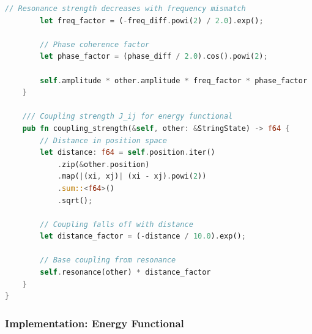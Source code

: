 \documentclass[11pt,a4paper]{article}
\begin{document}
\begin{lstlisting}[language=Rust, caption=String State Implementation from Q-Resonance]
        // Resonance strength decreases with frequency mismatch
        let freq_factor = (-freq_diff.powi(2) / 2.0).exp();

        // Phase coherence factor
        let phase_factor = (phase_diff / 2.0).cos().powi(2);

        self.amplitude * other.amplitude * freq_factor * phase_factor
    }

    /// Coupling strength J_ij for energy functional
    pub fn coupling_strength(&self, other: &StringState) -> f64 {
        // Distance in position space
        let distance: f64 = self.position.iter()
            .zip(&other.position)
            .map(|(xi, xj)| (xi - xj).powi(2))
            .sum::<f64>()
            .sqrt();

        // Coupling falls off with distance
        let distance_factor = (-distance / 10.0).exp();

        // Base coupling from resonance
        self.resonance(other) * distance_factor
    }
}
\end{lstlisting}

\subsubsection{Implementation: Energy Functional}
\end{document}
